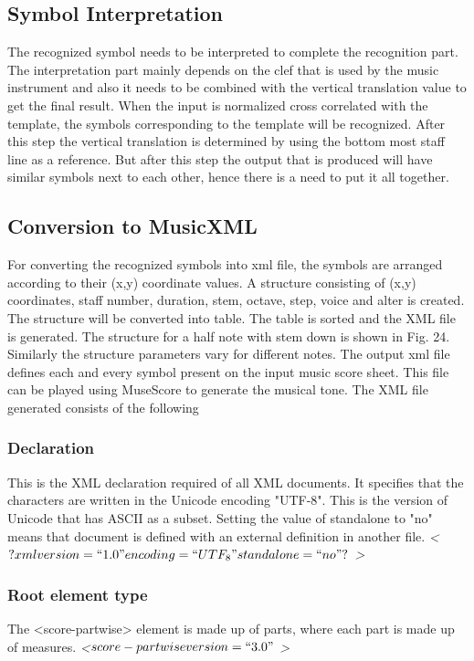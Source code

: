 \documentclass[journal]{IEEEtran}
\begin{document}
\subsection{Symbol Interpretation}
The recognized symbol needs to be interpreted to complete the recognition part. The interpretation part mainly depends on the clef that is used by the music instrument and also it needs to be combined with the vertical translation value to get the final result. When the input is normalized cross correlated with the template, the symbols corresponding to the template will be recognized. After
this step the vertical translation is determined by using the bottom most staff line as a reference. But after this step the output that is produced will have similar symbols next to each other, hence there is a need to put it all together.	



\subsection{Conversion to MusicXML}
For converting the recognized symbols into xml file, the symbols are arranged according to their (x,y) coordinate values. A structure consisting of (x,y) coordinates, staff number, duration, stem, octave, step, voice and alter is created. The structure will be converted into table. The table is sorted and the XML file is generated. The structure for a half note with stem down is shown in Fig. 24. Similarly the structure parameters vary for different notes. The output xml file defines each and every symbol present on the input music score sheet. This file can be played using MuseScore to generate the musical tone. 
The XML file generated consists of the following
\subsubsection{Declaration}

This is the XML declaration required of all XML documents. It specifies that the characters are
written in the Unicode encoding "UTF-8". This is the version of Unicode that has ASCII as a subset.
Setting the value of standalone to "no" means that document is defined with an external definition
in another file.\newline
\textit{ \textless $? xml version=``1.0" encoding=``UTF_8" standalone=``no"? $ \textgreater }

\subsubsection{Root element type}
The <score-partwise> element is made up of parts, where each
part is made up of measures.\newline
\textit{ \textless $ score-partwise version = ``3.0" $ \textgreater }  
\end{document}
